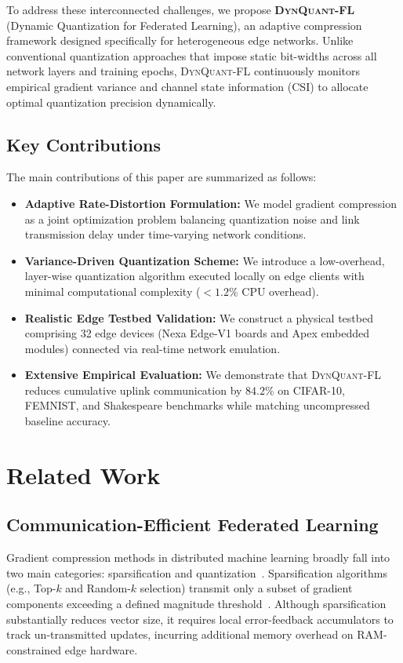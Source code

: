 \documentclass[conference]{IEEEtran}
\begin{document}
To address these interconnected challenges, we propose \textbf{\textsc{DynQuant-FL}} (Dynamic Quantization for Federated Learning), an adaptive compression framework designed specifically for heterogeneous edge networks. Unlike conventional quantization approaches that impose static bit-widths across all network layers and training epochs, \textsc{DynQuant-FL} continuously monitors empirical gradient variance and channel state information (CSI) to allocate optimal quantization precision dynamically.

\subsection{Key Contributions}
The main contributions of this paper are summarized as follows:
\begin{itemize}
    \item \textbf{Adaptive Rate-Distortion Formulation:} We model gradient compression as a joint optimization problem balancing quantization noise and link transmission delay under time-varying network conditions.
    \item \textbf{Variance-Driven Quantization Scheme:} We introduce a low-overhead, layer-wise quantization algorithm executed locally on edge clients with minimal computational complexity ($<1.2\%$ CPU overhead).
    \item \textbf{Realistic Edge Testbed Validation:} We construct a physical testbed comprising 32 edge devices (Nexa Edge-V1 boards and Apex embedded modules) connected via real-time network emulation.
    \item \textbf{Extensive Empirical Evaluation:} We demonstrate that \textsc{DynQuant-FL} reduces cumulative uplink communication by $84.2\%$ on CIFAR-10, FEMNIST, and Shakespeare benchmarks while matching uncompressed baseline accuracy.
\end{itemize}

\section{Related Work}
\subsection{Communication-Efficient Federated Learning}
Gradient compression methods in distributed machine learning broadly fall into two main categories: sparsification and quantization~\cite{alistarh2017qsgd, bernstein2018signsgd}. Sparsification algorithms (e.g., Top-$k$ and Random-$k$ selection) transmit only a subset of gradient components exceeding a defined magnitude threshold~\cite{stich2018sparsified}. Although sparsification substantially reduces vector size, it requires local error-feedback accumulators to track un-transmitted updates, incurring additional memory overhead on RAM-constrained edge hardware.
\end{document}
